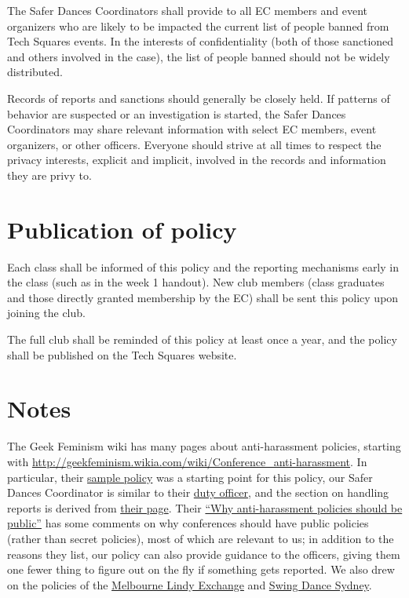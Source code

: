 \documentclass{article}
\begin{document}
The Safer Dances Coordinators shall provide to all EC members and event organizers who are likely to be impacted the current list of people banned from Tech Squares events. In the interests of confidentiality (both of those sanctioned and others involved in the case), the list of people banned should not be widely distributed.

Records of reports and sanctions should generally be closely held. If patterns of behavior are suspected or an investigation is started, the Safer Dances Coordinators may share relevant information with select EC members, event organizers, or other officers. Everyone should strive at all times to respect the privacy interests, explicit and implicit, involved in the records and information they are privy to.


\section{Publication of policy}

Each class shall be informed of this policy and the reporting mechanisms early in the class (such as in the week 1 handout). New club members (class graduates and those directly granted membership by the EC) shall be sent this policy upon joining the club.

The full club shall be reminded of this policy at least once a year, and the policy shall be published on the Tech Squares website.


\section{Notes}

The Geek Feminism wiki has many pages about anti-harassment policies, starting with \latex{\linebreak}\url{http://geekfeminism.wikia.com/wiki/Conference_anti-harassment}. In particular, their \href{http://geekfeminism.wikia.com/wiki/Conference_anti-harassment/Policy}{sample policy} was a starting point for this policy, our Safer Dances Coordinator is similar to their \href{http://geekfeminism.wikia.com/wiki/Conference_anti-harassment/Duty_officer}{duty officer}, and the section on handling reports is derived from \href{http://geekfeminism.wikia.com/wiki/Conference_anti-harassment/Responding_to_reports}{their page}. Their \href{http://geekfeminism.wikia.com/wiki/Why_anti-harassment_policies_should_be_public}{``Why anti-harassment policies should be public''} has some comments on why conferences should have public policies (rather than secret policies), most of which are relevant to us; in addition to the reasons they list, our policy can also provide guidance to the officers, giving them one fewer thing to figure out on the fly if something gets reported. We also drew on the policies of the \href{https://docs.google.com/document/d/1hh9mXPxmazx8r1W1YKEzOWGwC3iTGX0qyiQOEYzFk9Q/pub}{Melbourne Lindy Exchange} and \href{http://swingdancesydney.com/codeofconduct.html}{Swing Dance Sydney}.
\end{document}

